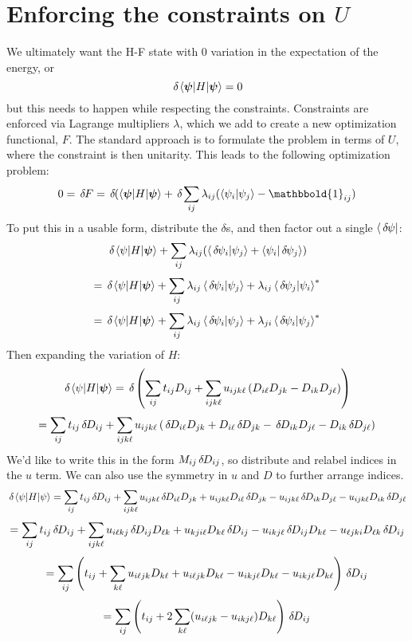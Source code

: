 \documentclass[a4paper,11pt]{article}
\newcommand{\9}{\,\,\,\,\,\,\,\,\,}
\newcommand{\Idt}{\mathbbold{1}}
\newcommand{\ichg}{\,\delta\hspace{-0.3mm}}
\begin{document}
\section{Enforcing the constraints on $U$}
We ultimately want the H-F state with 0 variation in the expectation of the energy, or
$$\ichg\braket{\bm\psi|H|\bm\psi} = 0$$
but this needs to happen while respecting the constraints. Constraints are enforced via Lagrange multipliers $\lambda$, which we add to create a new optimization functional, $F$. The standard approach is to formulate the problem in terms of $U$, where the constraint is then unitarity. This leads to the following optimization problem:
$$0 = \ichg F = \ichg (\braket{\bm\psi|H|\bm\psi} + \ichg\sum_{ij}\lambda_{ij}(\braket{\psi_i|\psi_j}-\Idt_{ij})$$
To put this in a usable form, distribute the $\delta$s, and then factor out a single $\bra{\ichg\psi}$:
$$ \ichg\braket{\psi|H|\bm\psi} + \sum_{ij}\lambda_{ij}(\braket{\ichg\psi_i|\psi_j}+\braket{\psi_i|\ichg\psi_j})$$
$$ = \ichg\braket{\psi|H|\bm\psi} + \sum_{ij}\lambda_{ij}\braket{\ichg\psi_i|\psi_j}+\lambda_{ij}\braket{\ichg\psi_j|\psi_i}^*$$
$$ = \ichg\braket{\psi|H|\bm\psi} + \sum_{ij}\lambda_{ij}\braket{\ichg\psi_i|\psi_j}+\lambda_{ji}\braket{\ichg\psi_i|\psi_j}^*$$
Then expanding the variation of $H$:
$$\ichg\braket{\psi|H|\bm\psi} = \ichg\left(\sum_{ij} t_{ij}D_{ij} + \sum_{ijk\ell}u_{ijk\ell}\,(D_{i\ell}D_{jk}-D_{ik}D_{j\ell})\right)$$
$$ = \sum_{ij} t_{ij}\ichg D_{ij} + \sum_{ijk\ell}u_{ijk\ell}\,(\ichg D_{i\ell}D_{jk}+D_{i\ell}\ichg D_{jk}-\ichg D_{ik}D_{j\ell}- D_{ik}\ichg D_{j\ell})$$
We'd like to write this in the form $M_{ij}\ichg D_{ij}$, so distribute and relabel indices in the $u$ term. We can also use the symmetry in $u$ and $D$ to further arrange indices.
$$\ichg\braket{\psi|H|\psi} = \sum_{ij} t_{ij}\ichg D_{ij} + \sum_{ijk\ell}u_{ijk\ell}\ichg D_{i\ell}D_{jk}+ u_{ijk\ell}D_{i\ell}\ichg D_{jk}- u_{ijk\ell}\ichg D_{ik}D_{j\ell}- u_{ijk\ell} D_{ik}\ichg D_{j\ell}$$
$$ = \sum_{ij} t_{ij}\ichg D_{ij} + \sum_{ijk\ell}u_{i\ell kj}\ichg D_{ij}D_{\ell k}+u_{kji\ell}D_{k\ell}\ichg D_{ij}-u_{ikj\ell}\ichg D_{ij}D_{k\ell}- u_{\ell jki} D_{\ell k}\ichg D_{ij}$$
$$ = \sum_{ij} \left(t_{ij} + \sum_{k\ell}u_{i\ell jk}D_{k\ell}+u_{i\ell jk}D_{k\ell}-u_{ikj\ell}D_{k\ell}- u_{ik j\ell} D_{k\ell}\right)\ichg D_{ij}$$
$$ = \sum_{ij} \left(t_{ij} + 2\sum_{k\ell}(u_{i\ell jk}-u_{ikj\ell}) D_{k\ell}\right)\ichg D_{ij}$$
\end{document}
